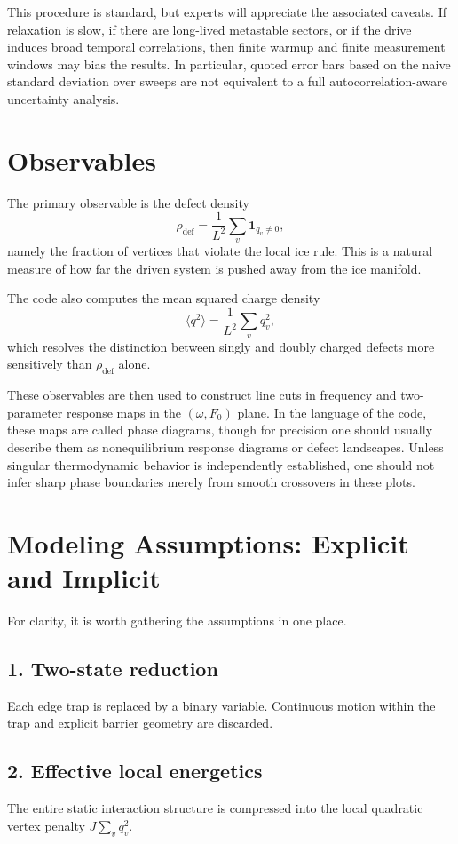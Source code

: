 \documentclass[11pt]{article}
\begin{document}
This procedure is standard, but experts will appreciate the associated caveats.
If relaxation is slow, if there are long-lived metastable sectors, or if the
drive induces broad temporal correlations, then finite warmup and finite
measurement windows may bias the results. In particular, quoted error bars based
on the naive standard deviation over sweeps are not equivalent to a full
autocorrelation-aware uncertainty analysis.

\section{Observables}

The primary observable is the defect density
\[
  \rho_{\mathrm{def}} =
  \frac{1}{L^2}\sum_v \mathbf{1}_{q_v \neq 0},
\]
namely the fraction of vertices that violate the local ice rule. This is a
natural measure of how far the driven system is pushed away from the ice
manifold.

The code also computes the mean squared charge density
\[
  \langle q^2 \rangle =
  \frac{1}{L^2}\sum_v q_v^2,
\]
which resolves the distinction between singly and doubly charged defects more
sensitively than $\rho_{\mathrm{def}}$ alone.

These observables are then used to construct line cuts in frequency and
two-parameter response maps in the $(\omega,F_0)$ plane. In the language of the
code, these maps are called phase diagrams, though for precision one should
usually describe them as nonequilibrium response diagrams or defect landscapes.
Unless singular thermodynamic behavior is independently established, one should
not infer sharp phase boundaries merely from smooth crossovers in these plots.

\section{Modeling Assumptions: Explicit and Implicit}

For clarity, it is worth gathering the assumptions in one place.

\subsection*{1. Two-state reduction}
Each edge trap is replaced by a binary variable. Continuous motion within the
trap and explicit barrier geometry are discarded.

\subsection*{2. Effective local energetics}
The entire static interaction structure is compressed into the local quadratic
vertex penalty $J\sum_v q_v^2$.
\end{document}
